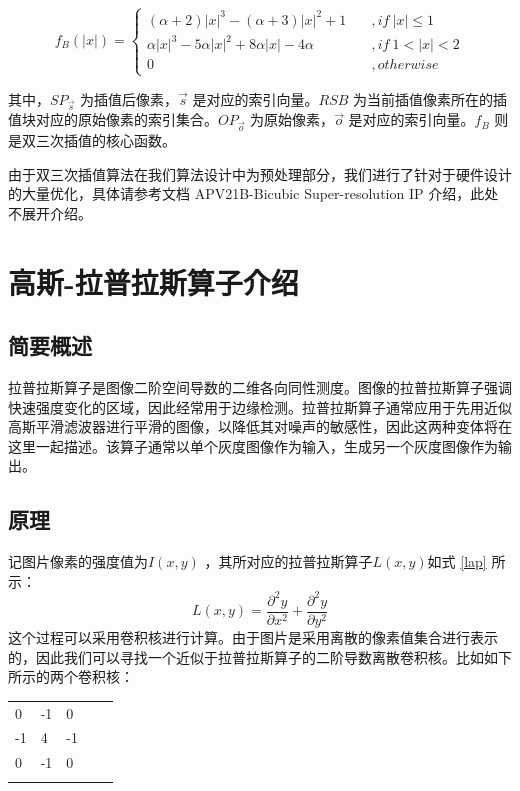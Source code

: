 \documentclass[12pt, a4paper, oneside]{ctexbook}
\begin{document}
	\begin{equation}
		f_B(|x|)=
		\begin{cases}
	(\alpha + 2)|x|^3-(\alpha+3)|x|^2+1\quad &,if\ |x| \leq1\\
	\alpha|x|^3-5\alpha|x|^2+8\alpha|x|-4\alpha\quad&,if \ 1<|x|<2\\
	0&,otherwise				
	\label{bicubic_2}
		\end{cases}
	\end{equation}
	\par
	其中，$SP_{\vec{s}}$ 为插值后像素，$\vec{s}$ 是对应的索引向量。$RSB$ 为当前插值像素所在的插值块对应的原始像素的索引集合。$OP_{\vec{o}}$ 为原始像素，$\vec{o}$ 是对应的索引向量。$f_B$ 则是双三次插值的核心函数。\par 由于双三次插值算法在我们算法设计中为预处理部分，我们进行了针对于硬件设计的大量优化，具体请参考文档 APV21B-Bicubic Super-resolution IP 介绍，此处不展开介绍。
	
	\section{高斯-拉普拉斯算子介绍}
	\subsection{简要概述}
	拉普拉斯算子是图像二阶空间导数的二维各向同性测度。图像的拉普拉斯算子强调快速强度变化的区域，因此经常用于边缘检测。拉普拉斯算子通常应用于先用近似高斯平滑滤波器进行平滑的图像，以降低其对噪声的敏感性，因此这两种变体将在这里一起描述。该算子通常以单个灰度图像作为输入，生成另一个灰度图像作为输出。
	\subsection{原理}
	记图片像素的强度值为$I(x,y)$ ，其所对应的拉普拉斯算子$L(x,y)$如式 \ref{lap} 所示：
	\begin{equation}	\label{lap}
		L(x,y)=\frac{\partial ^2 y}{\partial x^2} + \frac{\partial ^2 y}{\partial y^2}
	\end{equation}
	这个过程可以采用卷积核进行计算。由于图片是采用离散的像素值集合进行表示的，因此我们可以寻找一个近似于拉普拉斯算子的二阶导数离散卷积核。比如如下所示的两个卷积核：
	\begin{table}[h]
		\centering
		\begin{tabular}{lllll}
			\cline{1-3}
			\multicolumn{1}{|l|}{0}  & \multicolumn{1}{l|}{-1} & \multicolumn{1}{l|}{0}  &  &  \\ \cline{1-3}
			\multicolumn{1}{|l|}{-1} & \multicolumn{1}{l|}{4}  & \multicolumn{1}{l|}{-1} &  &  \\ \cline{1-3}
			\multicolumn{1}{|l|}{0}  & \multicolumn{1}{l|}{-1} & \multicolumn{1}{l|}{0}  &  &  \\ \cline{1-3}
			&                         &                         &  & 
		\end{tabular}
	\end{table}
\end{document}
